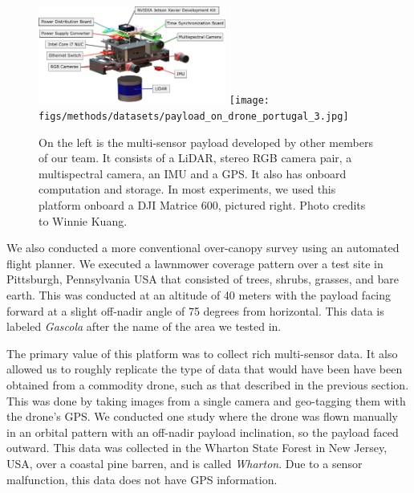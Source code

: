\begin{figure}
    \centering
    \includegraphics[width=0.55\textwidth]{figs/methods/datasets/payload_annotated.pdf}
    \hfill
    \texttt{[image: figs/methods/datasets/payload\_on\_drone\_portugal\_3.jpg]}
    \caption{On the left is the multi-sensor payload developed by other members of our team. It consists of a LiDAR, stereo RGB camera pair, a multispectral camera, an IMU and a GPS. It also has onboard computation and storage. In most experiments, we used this platform onboard a DJI Matrice 600, pictured right. Photo credits to Winnie Kuang.}
    \label{fig:methods:payload}
\end{figure}


We also conducted a more conventional over-canopy survey using an automated flight planner. We executed a lawnmower coverage pattern over a test site in Pittsburgh, Pennsylvania USA that consisted of trees, shrubs, grasses, and bare earth. This was conducted at an altitude of 40 meters with the payload facing forward at a slight off-nadir angle of 75 degrees from horizontal. This data is labeled \textit{Gascola} after the name of the area we tested in.

The primary value of this platform was to collect rich multi-sensor data. It also allowed us to roughly replicate the type of data that would have been have been obtained from a commodity drone, such as that described in the previous section. This was done by taking images from a single camera and geo-tagging them with the drone's GPS. We conducted one study where the drone was flown manually in an orbital pattern with an off-nadir payload inclination, so the payload faced outward. This data was collected in the Wharton State Forest in New Jersey, USA, over a coastal pine barren, and is called \textit{Wharton}. Due to a sensor malfunction, this data does not have GPS information.



